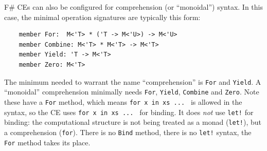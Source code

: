\documentclass[acmsmall]{acmart}\settopmatter{}
\begin{document}
F\# CEs can also be configured for comprehension (or ``monoidal'') syntax. In this case, the minimal operation signatures are typically this form:
\begin{verbatim}
    member For:  M<'T> * ('T -> M<'U>) -> M<'U>
    member Combine: M<'T> * M<'T> -> M<'T>
    member Yield: 'T -> M<'T>
    member Zero: M<'T>
\end{verbatim}
The minimum needed to warrant the name ``comprehension'' is \texttt{For} and \texttt{Yield}.  A ``monoidal'' comprehension minimally
needs \texttt{For}, \texttt{Yield}, \texttt{Combine} and \texttt{Zero}. 
Note these have a \texttt{For} method, which means \texttt{for x in xs  ... } is allowed in the syntax, so the CE uses \texttt{for x in xs ... } for binding.
It does \emph{not} use \texttt{let!} for binding: the computational structure is not being treated as a monad (\texttt{let!}), but a comprehension (\texttt{for}).
There is no \texttt{Bind} method, there is no \texttt{let!} syntax, the \texttt{For} method takes its place.  
\end{document}
